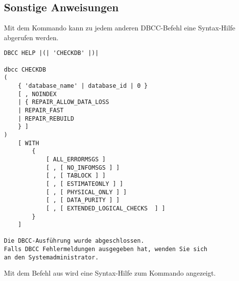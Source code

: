       \subsection{Sonstige Anweisungen}
        Mit dem Kommando  kann zu jedem anderen
        DBCC-Befehl eine Syntax-Hilfe abgerufen werden.
        \begin{lstlisting}[language=ms_sql, caption={DBCC Help - Syntaxhilfe
        aufrufen}, label=admin03_36] 
DBCC HELP |(| 'CHECKDB' |)|

dbcc CHECKDB 
(
    { 'database_name' | database_id | 0 }
    [ , NOINDEX
    | { REPAIR_ALLOW_DATA_LOSS
    | REPAIR_FAST
    | REPAIR_REBUILD
    } ]
)
    [ WITH
        {
            [ ALL_ERRORMSGS ]
            [ , [ NO_INFOMSGS ] ]
            [ , [ TABLOCK ] ]
            [ , [ ESTIMATEONLY ] ]
            [ , [ PHYSICAL_ONLY ] ]
            [ , [ DATA_PURITY ] ]
            [ , [ EXTENDED_LOGICAL_CHECKS  ] ]
        }
    ]

Die DBCC-Ausführung wurde abgeschlossen. 
Falls DBCC Fehlermeldungen ausgegeben hat, wenden Sie sich 
an den Systemadministrator.
          \end{lstlisting}          
          Mit dem Befehl aus  wird eine Syntax-Hilfe zum
          Kommando  angezeigt.
          \begin{literaturinternet}
            \item \cite{ms176040}
          \end{literaturinternet}
